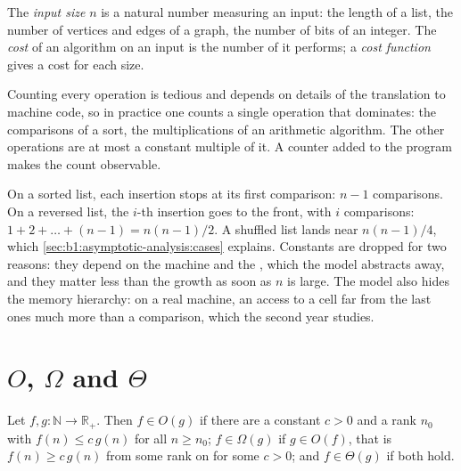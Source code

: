 \begin{definition}\label{def:b1:asymptotic-analysis:cost}
The \emph{input size} $n$ is a natural number measuring an input: the length of a list, the number of
vertices and edges of a graph, the number of bits of an integer. The \emph{cost} of an algorithm
on an input is the number of  it performs; a \emph{cost function} gives a cost for each size.
\end{definition}

Counting every operation is tedious and depends on details of the translation to machine code, so in practice one
counts a single operation that dominates: the comparisons of a sort, the multiplications of an arithmetic algorithm.
The other operations are at most a constant multiple of it. A counter added to the program makes the count observable.

\label{lst:b1:asymptotic-analysis:count-ops}

\label{out:b1:asymptotic-analysis:count-ops}

On a sorted list, each insertion stops at its first comparison: $n - 1$ comparisons. On a reversed list, the $i$-th
insertion goes to the front, with $i$ comparisons: $1 + 2 + \dots + (n - 1) = n(n - 1)/2$. A shuffled list lands near
$n(n - 1)/4$, which \cref{sec:b1:asymptotic-analysis:cases} explains. Constants are dropped for two reasons: they depend
on the machine and the , which the model abstracts away, and they matter less than the growth as soon as $n$
is large. The model also hides the memory hierarchy: on a real machine, an access to a cell far from the last ones
 much more than a comparison, which the second year studies.

\section{\texorpdfstring{$O$, $\Omega$ and $\Theta$}{O, Omega and Theta}}\label{sec:b1:asymptotic-analysis:big-o}

\begin{definition}\label{def:b1:asymptotic-analysis:big-o}
Let $f, g : \mathbb{N} \to \mathbb{R}_+$. Then $f \in O(g)$ if there are a constant $c > 0$ and a rank $n_0$
with $f(n) \leq c\,g(n)$ for all $n \geq n_0$; $f \in \Omega(g)$ if $g \in O(f)$, that is $f(n) \geq
c\,g(n)$ from some rank on for some $c > 0$; and $f \in \Theta(g)$ if both hold.
\end{definition}

